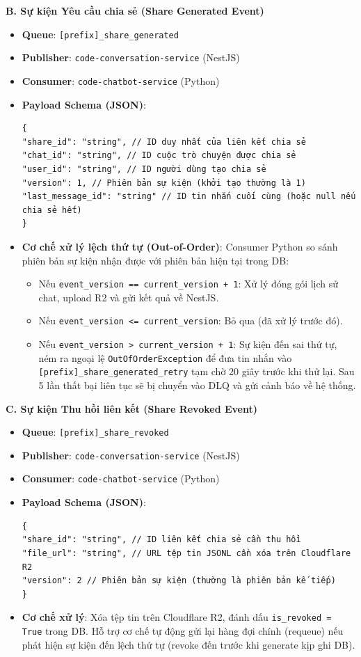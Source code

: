 \textbf{B. Sự kiện Yêu cầu chia sẻ (Share Generated Event)}
\begin{itemize}
\item \textbf{Queue}: \texttt{[prefix]\_share\_generated}
\item \textbf{Publisher}: \texttt{code-conversation-service} (NestJS)
\item \textbf{Consumer}: \texttt{code-chatbot-service} (Python)
\item \textbf{Payload Schema (JSON)}:
\begin{verbatim}
{
"share_id": "string", // ID duy nhất của liên kết chia sẻ
"chat_id": "string", // ID cuộc trò chuyện được chia sẻ
"user_id": "string", // ID người dùng tạo chia sẻ
"version": 1, // Phiên bản sự kiện (khởi tạo thường là 1)
"last_message_id": "string" // ID tin nhắn cuối cùng (hoặc null nếu chia sẻ hết)
}
\end{verbatim}
\item \textbf{Cơ chế xử lý lệch thứ tự (Out-of-Order)}:
Consumer Python so sánh phiên bản sự kiện nhận được với phiên bản hiện tại trong DB:
\begin{itemize}
\item Nếu \texttt{event\_version == current\_version + 1}: Xử lý đóng gói lịch sử chat, upload R2 và gửi kết quả về NestJS.
\item Nếu \texttt{event\_version <= current\_version}: Bỏ qua (đã xử lý trước đó).
\item Nếu \texttt{event\_version > current\_version + 1}: Sự kiện đến sai thứ tự, ném ra ngoại lệ \texttt{OutOfOrderException} để đưa tin nhắn vào \texttt{[prefix]\_share\_generated\_retry} tạm chờ 20 giây trước khi thử lại. Sau 5 lần thất bại liên tục sẽ bị chuyển vào DLQ và gửi cảnh báo về hệ thống.
\end{itemize}
\end{itemize}

\textbf{C. Sự kiện Thu hồi liên kết (Share Revoked Event)}
\begin{itemize}
\item \textbf{Queue}: \texttt{[prefix]\_share\_revoked}
\item \textbf{Publisher}: \texttt{code-conversation-service} (NestJS)
\item \textbf{Consumer}: \texttt{code-chatbot-service} (Python)
\item \textbf{Payload Schema (JSON)}:
\begin{verbatim}
{
"share_id": "string", // ID liên kết chia sẻ cần thu hồi
"file_url": "string", // URL tệp tin JSONL cần xóa trên Cloudflare R2
"version": 2 // Phiên bản sự kiện (thường là phiên bản kế tiếp)
}
\end{verbatim}
\item \textbf{Cơ chế xử lý}: Xóa tệp tin trên Cloudflare R2, đánh dấu \texttt{is\_revoked = True} trong DB. Hỗ trợ cơ chế tự động gửi lại hàng đợi chính (requeue) nếu phát hiện sự kiện đến lệch thứ tự (revoke đến trước khi generate kịp ghi DB).
\end{itemize}


